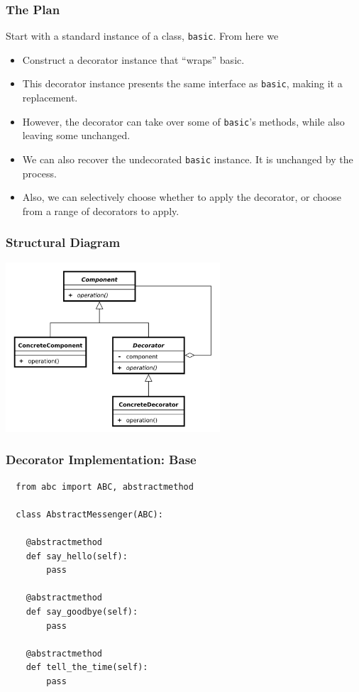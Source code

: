 \documentclass[10pt]{beamer}
\begin{document}
\begin{frame}
  \frametitle{The Plan}
  
  Start with a standard instance of a class, \texttt{basic}. From here we
  
  \begin{itemize}
    \item Construct a decorator instance that ``wraps'' basic.
    \item This decorator instance presents the same interface as \texttt{basic}, making it a replacement.
    \item However, the decorator can take over some of \texttt{basic}'s methods, while also leaving some unchanged.
    \item We can also recover the undecorated \texttt{basic} instance. It is unchanged by the process.
    \item Also, we can selectively choose whether to apply the decorator, or choose from a range of decorators to apply.
  \end{itemize}

  \end{frame}
\begin{frame}
  \frametitle{Structural Diagram} 
  \includegraphics[width=8cm]{decorator.jpg}
  \end{frame}

\begin{frame}[fragile]
  \frametitle{Decorator Implementation: Base }

  \begin{verbatim}
  from abc import ABC, abstractmethod
  
  class AbstractMessenger(ABC):
  
    @abstractmethod
    def say_hello(self):
        pass

    @abstractmethod
    def say_goodbye(self):
        pass

    @abstractmethod
    def tell_the_time(self):
        pass
        
  
  \end{verbatim}
 \end{frame} 
 
\end{document}
